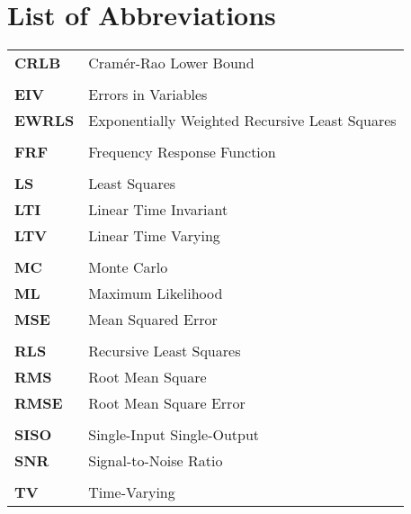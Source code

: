\chapter*{List of Abbreviations}
\begin{longtable}[c]{>{\raggedleft}p{}>{\raggedright}p{}}
\textbf{CRLB} &   Cram\'er-Rao Lower Bound\tabularnewline
\tabularnewline
\textbf{EIV} &  Errors in Variables\tabularnewline
\textbf{EWRLS} &  Exponentially Weighted Recursive Least Squares\tabularnewline
\tabularnewline
\textbf{FRF} &   Frequency Response Function\tabularnewline
\tabularnewline
\textbf{LS} &  Least Squares\tabularnewline
\textbf{LTI} &  Linear Time Invariant\tabularnewline
\textbf{LTV} &  Linear Time Varying\tabularnewline
\tabularnewline
\textbf{MC} &  Monte Carlo\tabularnewline
\textbf{ML} &  Maximum Likelihood\tabularnewline
\textbf{MSE} &  Mean Squared Error\tabularnewline
\tabularnewline
\textbf{RLS} &  Recursive Least Squares\tabularnewline
\textbf{RMS} &  Root Mean Square \tabularnewline
\textbf{RMSE} &  Root Mean Square Error\tabularnewline
\tabularnewline
\textbf{SISO} &  Single-Input Single-Output\tabularnewline
\textbf{SNR} &   Signal-to-Noise Ratio\tabularnewline
\tabularnewline
\textbf{TV} &   Time-Varying\tabularnewline

\end{longtable}
